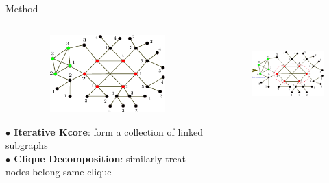 \documentclass{beamer}
\begin{document}
\begin{frame}[t]{Method}
\vspace{-1cm}
\begin{columns}[t] %
\begin{column}[t]{.5\textwidth}
	\begin{figure}
	  \includegraphics[width=1.0\textwidth, height=3.0cm]{images/Decomposition_1.pdf}
	\end{figure} 
	
	\textbf{$\bullet$ Iterative Kcore}: form a collection of linked subgraphs \vspace{.5em}\\
	\textbf{$\bullet$ Clique Decomposition}: similarly treat nodes belong same clique \vspace{.5em}\\ 
	
\end{column}%
\begin{column}{.5\textwidth}
	\begin{figure}
	  \includegraphics[width=1.0\textwidth, height=3.0cm]{images/Kcore.pdf}
	\end{figure}


\end{column}%
\end{columns}
\end{frame}
\end{document}

